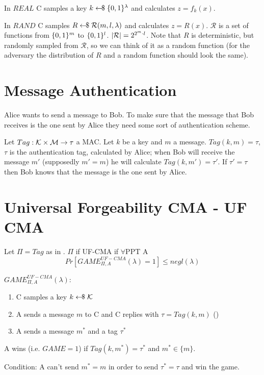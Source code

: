 In $REAL$ C samples a key $k \leftarrow\kern-0.42em{\$} \; \{0,1\}^\lambda$ and calculates $z = f_k(x)$.

In $RAND$ C samples $R \leftarrow\kern-0.42em{\$} \; \mathcal{R}(m,l,\lambda)$ and calculates $z = R(x)$.\newline
$\mathcal{R}$ is a set of functions from $\{0,1\}^m$ to $\{0,1\}^l$. $\vert \mathcal{R} \vert = 2^{2^m \cdot l}$.\newline
Note that $R$ is deterministic, but randomly sampled from $\mathcal{R}$, so we can think of it as a random function (for the adversary the distribution of $R$ and a random function should look the same).
\newpage

\section{Message Authentication} \label{psudo:mauth}
Alice wants to send a message to Bob. To make sure that the message that Bob receives is the one sent by Alice they need some sort of authentication scheme.\newline

Let $Tag : \mathcal{K} \times \mathcal{M}  \rightarrow \tau$ a MAC.\newline
Let $k$ be a key and $m$ a message.
$Tag(k,m) = \tau$, $\tau$ is the authentication tag, calculated by Alice; when Bob will receive the message $m'$ (supposedly $m' = m$) he will calculate $Tag(k,m') = \tau'$. If $\tau' = \tau$ then Bob knows that the message is the one sent by Alice.


\section{Universal Forgeability CMA - UF CMA}
Let $\Pi = Tag$ as in . $\Pi$ if UF-CMA if $\forall$PPT A
\[ Pr[GAME_{\Pi,A}^{UF-CMA} (\lambda) = 1] \leq negl(\lambda) \]

$GAME_{\Pi,A}^{UF-CMA} (\lambda)$:
\begin{enumerate}
    \item C samples a key $k \leftarrow\kern-0.42em{\$} \; \mathcal{K}$
    \item A sends a message $m$ to C and C replies with $\tau = Tag(k,m)$ (\poly)
    \item A sends a message $m^*$ and a tag $\tau^*$
\end{enumerate}
A wins (i.e. $GAME = 1$) if $Tag(k,m^*) = \tau^*$ and $m^* \in \{m\}$.

Condition: A can't send $m^* = m$ in order to send $\tau^* = \tau$ and win the game.



